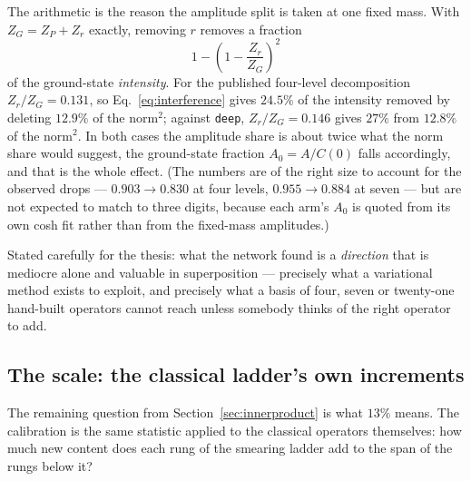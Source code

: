 \documentclass[11pt,a4paper]{article}
\newcommand{\Azero}{A_0}
\newcommand{\arm}[1]{\texttt{#1}}
\begin{document}
The arithmetic is the reason the amplitude split is taken at one fixed mass.
With $Z_G = Z_P + Z_r$ exactly, removing $r$ removes a fraction
\begin{equation}
  1 - \left(1 - \frac{Z_r}{Z_G}\right)^{2}
  \label{eq:interference}
\end{equation}
of the ground-state \emph{intensity}. For the published four-level decomposition
$Z_r/Z_G = 0.131$, so Eq.~\eqref{eq:interference} gives $24.5\%$ of the intensity
removed by deleting $12.9\%$ of the norm${}^2$; against \arm{deep},
$Z_r/Z_G = 0.146$ gives $27\%$ from $12.8\%$ of the norm${}^2$. In both cases
the amplitude share is about twice what the norm share would suggest, the
ground-state fraction $\Azero = A/C(0)$ falls accordingly, and that is the whole
effect. (The numbers are of the right size to account for the observed drops ---
$0.903 \to 0.830$ at four levels, $0.955 \to 0.884$ at seven --- but are not
expected to match to three digits, because each arm's $\Azero$ is quoted from
its own cosh fit rather than from the fixed-mass amplitudes.)

Stated carefully for the thesis: what the network found is a \emph{direction}
that is mediocre alone and valuable in superposition --- precisely what a
variational method exists to exploit, and precisely what a basis of four, seven
or twenty-one hand-built operators cannot reach unless somebody thinks of the
right operator to add.

\subsection{The scale: the classical ladder's own increments}
\label{sec:ladder}

The remaining question from Section~\ref{sec:innerproduct} is what $13\%$ means.
The calibration is the same statistic applied to the classical operators
themselves: how much new content does each rung of the smearing ladder add to
the span of the rungs below it?
\end{document}

